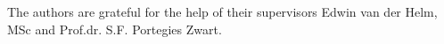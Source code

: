 \documentclass{aa}
\begin{document}
\begin{acknowledgements}
      The authors are grateful for the help of their supervisors
      Edwin van der Helm, MSc and Prof.dr. S.F. Portegies Zwart.
\end{acknowledgements}



 
 

%
%
%
%
%
%   
%  
%
%
\end{document}
